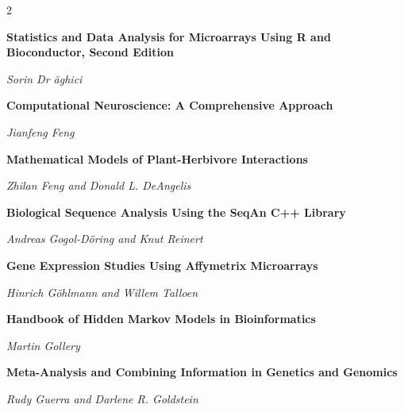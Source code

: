 \begin{multicols}{2}
\begin{minipage}{\linewidth}
\raggedright
\textbf{Statistics and Data Analysis for Microarrays Using R and Bioconductor, Second Edition}\par
\textit{Sorin Dr ăghici}
\end{minipage}\par\medskip
\par\noindent\begin{minipage}{\linewidth}
\raggedright
\textbf{Computational Neuroscience: A Comprehensive Approach}\par
\textit{Jianfeng Feng}
\end{minipage}\par\medskip
\par\noindent\begin{minipage}{\linewidth}
\raggedright
\textbf{Mathematical Models of Plant-Herbivore Interactions}\par
\textit{Zhilan Feng and Donald L. DeAngelis}
\end{minipage}\par\medskip
\par\noindent\begin{minipage}{\linewidth}
\raggedright
\textbf{Biological Sequence Analysis Using the SeqAn C++ Library}\par
\textit{Andreas Gogol-Döring and Knut Reinert}
\end{minipage}\par\medskip
\par\noindent\begin{minipage}{\linewidth}
\raggedright
\textbf{Gene Expression Studies Using Affymetrix Microarrays}\par
\textit{Hinrich Göhlmann and Willem Talloen}
\end{minipage}\par\medskip
\par\noindent\begin{minipage}{\linewidth}
\raggedright
\textbf{Handbook of Hidden Markov Models in Bioinformatics}\par
\textit{Martin Gollery}
\end{minipage}\par\medskip
\par\noindent\begin{minipage}{\linewidth}
\raggedright
\textbf{Meta-Analysis and Combining Information in Genetics and Genomics}\par
\textit{Rudy Guerra and Darlene R. Goldstein}
\end{minipage}\par\medskip

\end{multicols}
